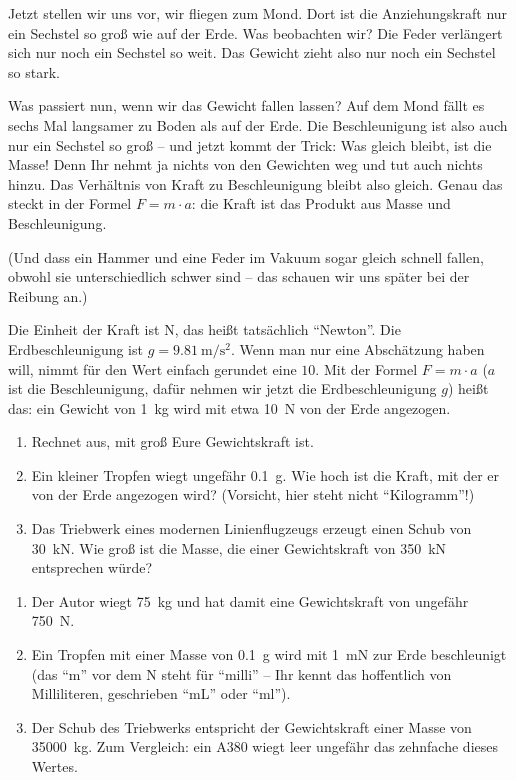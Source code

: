 Jetzt stellen wir uns vor, wir fliegen zum Mond. Dort ist die Anziehungskraft nur ein Sechstel so groß wie auf der Erde. Was beobachten wir? Die Feder verlängert sich nur noch ein Sechstel so weit. Das Gewicht zieht also nur noch ein Sechstel so stark.

Was passiert nun, wenn wir das Gewicht fallen lassen? Auf dem Mond fällt es sechs Mal langsamer zu Boden als auf der Erde. Die Beschleunigung ist also auch nur ein Sechstel so groß -- und jetzt kommt der Trick: Was gleich bleibt, ist die Masse! Denn Ihr nehmt ja nichts von den Gewichten weg und tut auch nichts hinzu. Das Verhältnis von Kraft zu Beschleunigung bleibt also gleich. Genau das steckt in der Formel $F=m\cdot a$: die Kraft ist das Produkt aus Masse und Beschleunigung. 

(Und dass ein Hammer und eine Feder im Vakuum sogar gleich schnell fallen, obwohl sie unterschiedlich schwer sind -- das schauen wir uns später bei der Reibung an.)

\begin{challenge}
    Die Einheit der Kraft ist $\mathrm{N}$, das heißt tatsächlich ``Newton''. Die Erdbeschleunigung ist $g = \qty{9,81}{\meter\per\second^2}$. Wenn man nur eine Abschätzung haben will, nimmt für den Wert einfach gerundet eine $10$. Mit der Formel $F=m\cdot a$ ($a$ ist die Beschleunigung, dafür nehmen wir jetzt die Erdbeschleunigung $g$) heißt das: ein Gewicht von \qty{1}{\kg} wird mit etwa \qty{10}{\N} von der Erde angezogen.
    \begin{enumerate}[label=\roman*)]
        \item Rechnet aus, mit groß Eure Gewichtskraft ist.
        \item Ein kleiner Tropfen wiegt ungefähr \qty{0.1}{\g}. Wie hoch ist die Kraft, mit der er von der Erde angezogen wird? (Vorsicht, hier steht nicht ``Kilogramm''!)
        \item Das Triebwerk eines modernen Linienflugzeugs erzeugt einen Schub von \qty{30}{\kilo\N}. Wie groß ist die Masse, die einer Gewichtskraft von \qty{350}{\kilo\N} entsprechen würde?
    \end{enumerate}
    \begin{solution}
        \begin{enumerate}[label=\roman*)]
            \item Der Autor wiegt \qty{75}{\kg} und hat damit eine Gewichtskraft von ungefähr \qty{750}{\N}.
            \item Ein Tropfen mit einer Masse von \qty{0.1}{\g} wird mit \qty{1}{\milli\N} zur Erde beschleunigt (das ``m'' vor dem N steht für ``milli'' -- Ihr kennt das hoffentlich von Milliliteren, geschrieben ``mL'' oder ``ml'').
            \item Der Schub des Triebwerks entspricht der Gewichtskraft einer Masse von \qty[exponent-mode=fixed]{35000}{\kg}. Zum Vergleich: ein A380 wiegt leer ungefähr das zehnfache dieses Wertes.  
        \end{enumerate}
    \end{solution}
\end{challenge}


